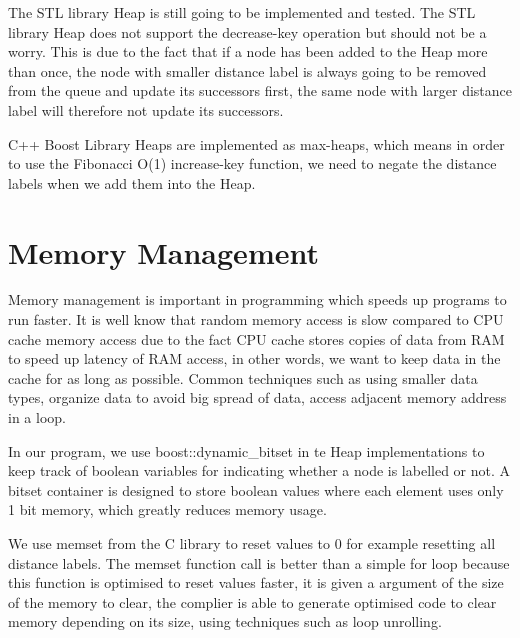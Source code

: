 The STL library Heap is still going to be implemented and tested.
The STL library Heap does not support the decrease-key operation but
should not be a worry.
This is due to the fact that if a node has been added to the Heap more than once,
the node with smaller distance label is always going to be removed from the queue and update its successors first,
the same node with larger distance label will therefore not update its successors.


C++ Boost Library Heaps are implemented as max-heaps,
which means in order to use the Fibonacci O(1) increase-key function,
we need to negate the distance labels when we add them into the Heap.


\section{Memory Management}
Memory management is important in programming which speeds up programs to run faster.
It is well know that random memory access is slow compared to CPU cache memory access due to the fact CPU cache stores copies of data from RAM to speed up latency of RAM access, in other words, we want to keep data in the cache for as long as possible.
Common techniques such as using smaller data types,
organize data to avoid big spread of data,
access adjacent memory address in a loop.

In our program,
we use boost::dynamic\_bitset in te Heap implementations to keep track of boolean variables for indicating whether a node is labelled or not.
A bitset container is designed to store boolean values where each
element uses only 1 bit memory,
which greatly reduces memory usage.

We use memset from the C library  to reset values to 0 for example resetting all distance labels.
The memset function call is better than a simple for loop because this function is optimised to reset values faster,
it is given a argument of the size of the memory to clear,
the complier is able to generate optimised code to clear memory depending on its size, using techniques such as loop unrolling.

